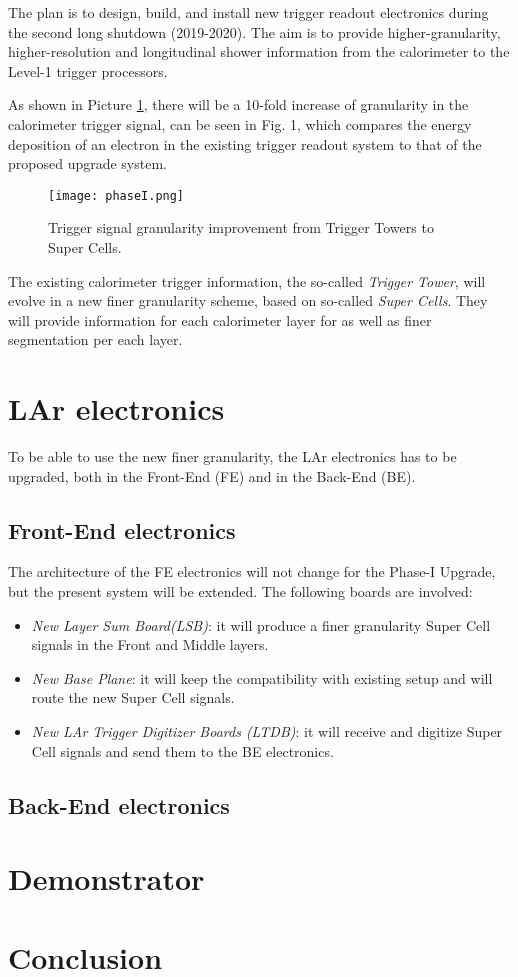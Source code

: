 \documentclass{llncs}
\begin{document}
The plan is to design, build, and install new trigger readout electronics during the second long shutdown (2019-2020). The aim is to   provide higher-granularity, higher-resolution and longitudinal shower information from the calorimeter to the Level-1 trigger processors.

As shown in Picture \ref{fig:PhaseI}, there will be a 10-fold increase
of granularity in the calorimeter trigger signal, can be seen in Fig. 1, which compares the energy deposition of an electron in the
existing trigger readout system to that of the proposed upgrade system. 

\begin{figure}[t]
	\centering	
	\texttt{[image: phaseI.png]}
	\caption{Trigger signal granularity improvement from Trigger Towers to Super Cells.}
	\label{fig:PhaseI}
\end{figure}

The existing calorimeter trigger information, the so-called \emph{Trigger Tower}, will evolve in a new finer granularity scheme, based on so-called \emph{Super Cells}. They will provide information
for each calorimeter layer for as well as finer segmentation per each layer. \cite{Aleksa:1602230}

\section{LAr electronics}
To be able to use the new finer granularity, the LAr electronics has to be upgraded, both in the Front-End (FE) and in the Back-End (BE).

\subsection{Front-End electronics}
The architecture of the FE electronics will not change for the Phase-I Upgrade, but the present system will be extended. The following boards are involved:
\begin{itemize}
\item \emph{New Layer Sum Board(LSB)}: it will produce a finer granularity Super Cell signals in the Front and Middle layers.
\item \emph{New Base Plane}: it will keep the compatibility with existing setup and will route the new Super Cell signals.
\item \emph{New LAr Trigger Digitizer Boards (LTDB)}: it will receive and digitize Super Cell signals and send them to the BE electronics.
\end{itemize}



\subsection{Back-End electronics}

\section{Demonstrator}

\section{Conclusion}



\end{document}
